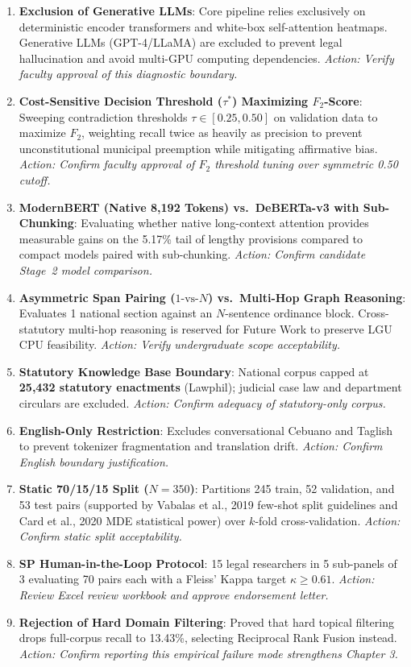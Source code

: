 \documentclass[10pt,letterpaper]{article}
\begin{document}
\begin{enumerate}[label=\textbf{Decision \arabic*:},leftmargin=6.5em]
    \item \textbf{Exclusion of Generative LLMs}: Core pipeline relies exclusively on deterministic encoder transformers and white-box self-attention heatmaps. Generative LLMs (GPT-4/LLaMA) are excluded to prevent legal hallucination and avoid multi-GPU computing dependencies. \textit{Action: Verify faculty approval of this diagnostic boundary.}
    \item \textbf{Cost-Sensitive Decision Threshold ($\tau^*$) Maximizing $F_2$-Score}: Sweeping contradiction thresholds $\tau \in [0.25, 0.50]$ on validation data to maximize $F_2$, weighting recall twice as heavily as precision to prevent unconstitutional municipal preemption while mitigating affirmative bias. \textit{Action: Confirm faculty approval of $F_2$ threshold tuning over symmetric 0.50 cutoff.}
    \item \textbf{ModernBERT (Native 8,192 Tokens) vs.\ DeBERTa-v3 with Sub-Chunking}: Evaluating whether native long-context attention provides measurable gains on the 5.17\% tail of lengthy provisions compared to compact models paired with sub-chunking. \textit{Action: Confirm candidate Stage~2 model comparison.}
    \item \textbf{Asymmetric Span Pairing ($1\text{-vs-}N$) vs.\ Multi-Hop Graph Reasoning}: Evaluates 1 national section against an $N$-sentence ordinance block. Cross-statutory multi-hop reasoning is reserved for Future Work to preserve LGU CPU feasibility. \textit{Action: Verify undergraduate scope acceptability.}
    \item \textbf{Statutory Knowledge Base Boundary}: National corpus capped at \textbf{25,432 statutory enactments} (Lawphil); judicial case law and department circulars are excluded. \textit{Action: Confirm adequacy of statutory-only corpus.}
    \item \textbf{English-Only Restriction}: Excludes conversational Cebuano and Taglish to prevent tokenizer fragmentation and translation drift. \textit{Action: Confirm English boundary justification.}
    \item \textbf{Static 70/15/15 Split ($N=350$)}: Partitions 245 train, 52 validation, and 53 test pairs (supported by Vabalas et al., 2019 few-shot split guidelines and Card et al., 2020 MDE statistical power) over $k$-fold cross-validation. \textit{Action: Confirm static split acceptability.}
    \item \textbf{SP Human-in-the-Loop Protocol}: 15 legal researchers in 5 sub-panels of 3 evaluating 70 pairs each with a Fleiss' Kappa target $\kappa \ge 0.61$. \textit{Action: Review Excel review workbook and approve endorsement letter.}
    \item \textbf{Rejection of Hard Domain Filtering}: Proved that hard topical filtering drops full-corpus recall to 13.43\%, selecting Reciprocal Rank Fusion instead. \textit{Action: Confirm reporting this empirical failure mode strengthens Chapter 3.}
\end{enumerate}
\end{document}
